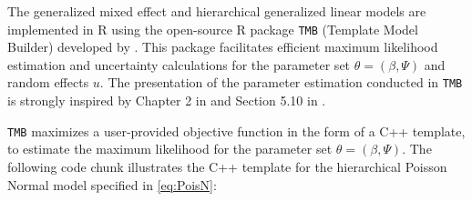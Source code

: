 \documentclass[preprint, 3p, authoryear]{elsarticle} %
\begin{document}
The generalized mixed effect and hierarchical generalized linear models are implemented in R using the open-source R package \texttt{TMB} (Template Model Builder) developed by \citet{Kristensen_2016}. This package facilitates efficient maximum likelihood estimation and uncertainty calculations for the parameter set \(\theta=(\beta, \Psi)\) and random effects \(u\). The presentation of the parameter estimation conducted in \texttt{TMB} is strongly inspired by Chapter 2 in \citet{Kristensen_2016} and Section 5.10 in \citet{Madsen_2010}.

\texttt{TMB} maximizes a user-provided objective function in the form of a C++ template, to estimate the maximum likelihood for the parameter set \(\theta=(\beta, \Psi)\). The following code chunk illustrates the C++ template for the hierarchical Poisson Normal model specified in \ref{eq:PoisN}:
\end{document}
